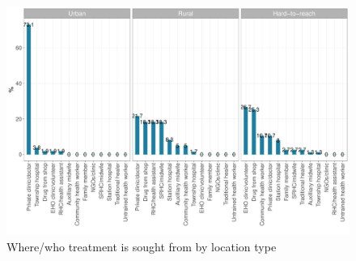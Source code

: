 \documentclass[12pt,a4paper]{article}
\begin{document}
\begin{figure}[H]

{\centering \includegraphics{kayinReport_files/figure-latex/ari6plot-1} 

}

\caption{Where/who treatment is sought from by location type}\label{fig:ari6plot}
\end{figure}
\end{document}
